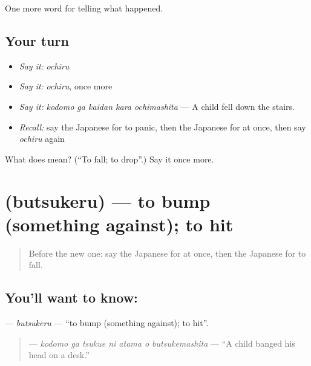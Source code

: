 \begin{grammarlens}[title={What you've built}]
One more word for telling what happened.
\end{grammarlens}

\subsection*{Your turn}
\begin{itemize}
\raggedright
  \item \emph{Say it:} \emph{ochiru}
  \item \emph{Say it:} \emph{ochiru}, once more
  \item \emph{Say it:} \emph{kodomo ga kaidan kara ochimashita} — A child fell down the stairs.
  \item \emph{Recall:} say the Japanese for to panic, then the Japanese for at once, then say \emph{ochiru} again
\end{itemize}

\begin{tcolorbox}[breakable,colback=teal!4,colframe=teal!35!black,title={Before you move on}]
What does  mean? (\textquotedblleft{}To fall; to drop\textquotedblright{}.) Say it once more.
\end{tcolorbox}
\section[\texorpdfstring{\ja{ぶつける} (butsukeru)}{ぶつける (butsukeru)}]{ (butsukeru) — to bump (something against); to hit}

\label{lesson:JA-C264-butsukeru}



\begin{quote}
Before the new one: say the Japanese for at once, then the Japanese for to fall.
\end{quote}

\subsection*{You'll want to know: }
\textbf{} — \emph{butsukeru} — \textquotedblleft{}to bump (something against); to hit\textquotedblright{}.

\begin{quote}
\textbf{   } — \emph{kodomo ga tsukue ni atama o butsukemashita} — \textquotedblleft{}A child banged his head on a desk.\textquotedblright{}
\end{quote}

